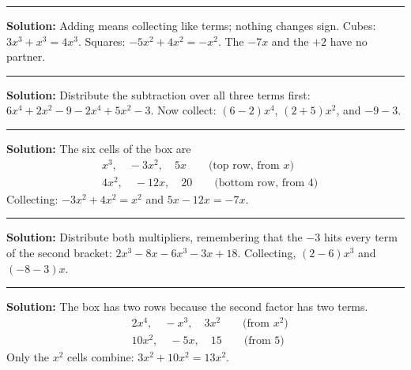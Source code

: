 \documentclass[12pt]{article}
\begin{document}



\vspace{0.3cm}
\noindent\rule{\linewidth}{0.4pt}
\vspace{0.2cm}


\textbf{Solution:} Adding means collecting like terms; nothing changes sign.
Cubes: $3x^{3} + x^{3} = 4x^{3}$. Squares: $-5x^{2} + 4x^{2} = -x^{2}$. The
$-7x$ and the $+2$ have no partner. 

\vspace{0.15cm}
\noindent\rule{\linewidth}{0.2pt}


\textbf{Solution:} Distribute the subtraction over all three terms first:
$6x^{4} + 2x^{2} - 9 - 2x^{4} + 5x^{2} - 3$. Now collect:
$(6 - 2)x^{4}$, $(2 + 5)x^{2}$, and $-9 - 3$. 

\vspace{0.15cm}
\noindent\rule{\linewidth}{0.2pt}


\textbf{Solution:} The six cells of the box are
\begin{align*}
  &x^{3},\quad -3x^{2},\quad 5x \qquad \text{(top row, from } x) \\
  &4x^{2},\quad -12x,\quad 20 \qquad \text{(bottom row, from } 4)
\end{align*}
Collecting: $-3x^{2} + 4x^{2} = x^{2}$ and $5x - 12x = -7x$. 

\vspace{0.15cm}
\noindent\rule{\linewidth}{0.2pt}


\textbf{Solution:} Distribute both multipliers, remembering that the $-3$ hits
every term of the second bracket: $2x^{3} - 8x - 6x^{3} - 3x + 18$. Collecting,
$(2 - 6)x^{3}$ and $(-8 - 3)x$. 

\vspace{0.15cm}
\noindent\rule{\linewidth}{0.2pt}


\textbf{Solution:} The box has two rows because the second factor has two terms.
\begin{align*}
  &2x^{4},\quad -x^{3},\quad 3x^{2} \qquad \text{(from } x^{2}) \\
  &10x^{2},\quad -5x,\quad 15 \qquad \text{(from } 5)
\end{align*}
Only the $x^{2}$ cells combine: $3x^{2} + 10x^{2} = 13x^{2}$. 
\end{document}
